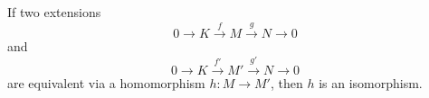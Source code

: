 If two extensions
$$0 \rightarrow K \xrightarrow{f} M \xrightarrow{g} N \rightarrow 0$$
and
$$0 \rightarrow K \xrightarrow{f'} M' \xrightarrow{g'} N \rightarrow 0$$
are equivalent via a homomorphism $h: M \rightarrow M'$, then $h$ is an isomorphism.
